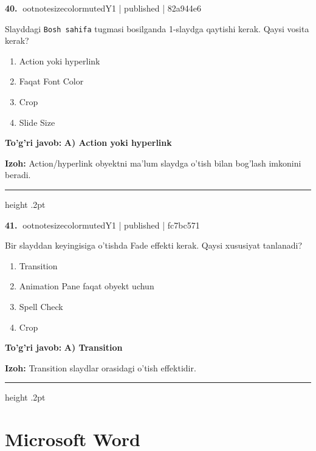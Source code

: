 \documentclass[10pt,a4paper]{article}
\begin{document}
\textbf{\color{ink}40.} {ootnotesizecolor{muted}Y1 | published | 82a944e6}
\par
Slayddagi \texttt{Bosh sahifa} tugmasi bosilganda 1-slaydga qaytishi kerak. Qaysi vosita kerak?
\begin{enumerate}[label=\Alph*),leftmargin=9mm]
\item Action yoki hyperlink
\item Faqat Font Color
\item Crop
\item Slide Size
\end{enumerate}
\begin{tcolorbox}[enhanced,breakable,colback=teal!4,colframe=teal!55!black,boxrule=0.45pt,arc=1.2mm,left=2.8mm,right=2.8mm,top=2mm,bottom=2mm]
\textbf{\color{teal}To'g'ri javob:} \textbf{A) Action yoki hyperlink}
\par\smallskip
\textbf{Izoh:} Action/hyperlink obyektni ma'lum slaydga o'tish bilan bog'lash imkonini beradi.
\end{tcolorbox}
\vspace{2mm}\hrule height .2pt\vspace{2mm}

\textbf{\color{ink}41.} {ootnotesizecolor{muted}Y1 | published | fc7bc571}
\par
Bir slayddan keyingisiga o'tishda Fade effekti kerak. Qaysi xususiyat tanlanadi?
\begin{enumerate}[label=\Alph*),leftmargin=9mm]
\item Transition
\item Animation Pane faqat obyekt uchun
\item Spell Check
\item Crop
\end{enumerate}
\begin{tcolorbox}[enhanced,breakable,colback=teal!4,colframe=teal!55!black,boxrule=0.45pt,arc=1.2mm,left=2.8mm,right=2.8mm,top=2mm,bottom=2mm]
\textbf{\color{teal}To'g'ri javob:} \textbf{A) Transition}
\par\smallskip
\textbf{Izoh:} Transition slaydlar orasidagi o'tish effektidir.
\end{tcolorbox}
\vspace{2mm}\hrule height .2pt\vspace{2mm}
\section{Microsoft Word}
\end{document}
